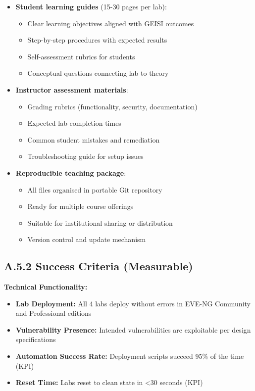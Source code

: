 \begin{itemize}
    \item \textbf{Student learning guides} (15-30 pages per lab):
    \begin{itemize}
        \item Clear learning objectives aligned with GEISI outcomes
        \item Step-by-step procedures with expected results
        \item Self-assessment rubrics for students
        \item Conceptual questions connecting lab to theory
    \end{itemize}
    
    \item \textbf{Instructor assessment materials}:
    \begin{itemize}
        \item Grading rubrics (functionality, security, documentation)
        \item Expected lab completion times
        \item Common student mistakes and remediation
        \item Troubleshooting guide for setup issues
    \end{itemize}
    
    \item \textbf{Reproducible teaching package}:
    \begin{itemize}
        \item All files organised in portable Git repository
        \item Ready for multiple course offerings
        \item Suitable for institutional sharing or distribution
        \item Version control and update mechanism
    \end{itemize}
\end{itemize}


\subsection*{A.5.2 Success Criteria (Measurable)}


\textbf{Technical Functionality:}
\begin{itemize}
    \item \textbf{Lab Deployment:} All 4 labs deploy without errors in EVE-NG Community and Professional editions
    \item \textbf{Vulnerability Presence:} Intended vulnerabilities are exploitable per design specifications
    \item \textbf{Automation Success Rate:} Deployment scripts succeed 95\% of the time (KPI)
    \item \textbf{Reset Time:} Labs reset to clean state in <30 seconds (KPI)
\end{itemize}


